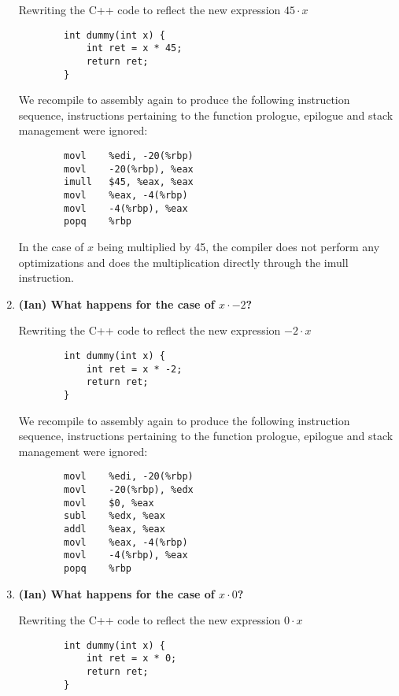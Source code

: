 \documentclass{article}
\begin{document}
\begin{enumerate}
    Rewriting the C++ code to reflect the new expression \(45 \cdot x\)

    \begin{verbatim}
        int dummy(int x) {
            int ret = x * 45;
            return ret;
        }
    \end{verbatim}

    We recompile to assembly again to produce the following instruction sequence, instructions pertaining to
    the function prologue, epilogue and stack management were ignored:

    \begin{verbatim}
        movl	%edi, -20(%rbp)
        movl	-20(%rbp), %eax
        imull	$45, %eax, %eax
        movl	%eax, -4(%rbp)
        movl	-4(%rbp), %eax
        popq	%rbp
    \end{verbatim}

    In the case of \(x\) being multiplied by 45, the compiler does not perform any optimizations and does the
    multiplication directly through the imull instruction.

    \item \textbf{(Ian) What happens for the case of \( x \cdot -2 \)?}
    
    Rewriting the C++ code to reflect the new expression \(-2 \cdot x\)

    \begin{verbatim}
        int dummy(int x) {
            int ret = x * -2;
            return ret;
        }
    \end{verbatim}

    We recompile to assembly again to produce the following instruction sequence, instructions pertaining to
    the function prologue, epilogue and stack management were ignored:

    \begin{verbatim}
        movl	%edi, -20(%rbp)
        movl	-20(%rbp), %edx
        movl	$0, %eax
        subl	%edx, %eax
        addl	%eax, %eax
        movl	%eax, -4(%rbp)
        movl	-4(%rbp), %eax
        popq	%rbp
    \end{verbatim}

    \item \textbf{(Ian) What happens for the case of \( x \cdot  0 \)?}
    
    Rewriting the C++ code to reflect the new expression \(0 \cdot x\)

    \begin{verbatim}
        int dummy(int x) {
            int ret = x * 0;
            return ret;
        }
    \end{verbatim}


\end{enumerate}
\end{document}
